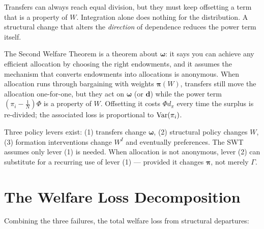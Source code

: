 \documentclass[../structural_economics_book.tex]{subfiles}
\begin{document}
\begin{example}
Transfers can always reach equal division, but they must keep offsetting a term that is a property of $W$. Integration alone does nothing for the distribution. A structural change that alters the \textit{direction} of dependence reduces the power term itself.
\end{example}

\begin{keyinsight}
The Second Welfare Theorem is a theorem about $\boldsymbol{\omega}$: it says you can achieve any efficient allocation by choosing the right endowments, and it assumes the mechanism that converts endowments into allocations is anonymous. When allocation runs through bargaining with weights $\boldsymbol{\pi}(W)$, transfers still move the allocation one-for-one, but they act on $\boldsymbol{\omega}$ (or $\mathbf{d}$) while the power term $(\pi_i - \frac{1}{N})\Phi$ is a property of $W$. Offsetting it costs $\Phi d_\pi$ every time the surplus is re-divided; the associated loss is proportional to $\operatorname{Var}(\pi_i)$.

Three policy levers exist: (1) transfers change $\boldsymbol{\omega}$, (2) structural policy changes $W$, (3) formation interventions change $W^I$ and eventually preferences. The SWT assumes only lever (1) is needed. When allocation is not anonymous, lever (2) can substitute for a recurring use of lever (1) --- provided it changes $\boldsymbol{\pi}$, not merely $\Gamma$.
\end{keyinsight}


\section{The Welfare Loss Decomposition}
\label{ch02:sec:decomposition}

Combining the three failures, the total welfare loss from structural departures:
\end{document}
